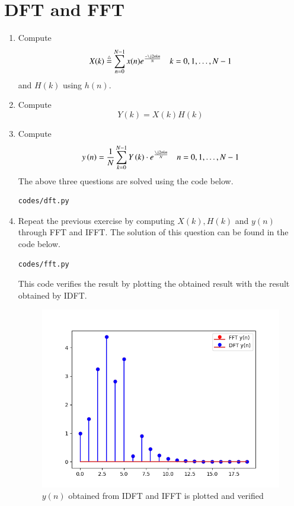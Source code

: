\documentclass[journal,12pt,twocolumn]{IEEEtran}
\newcommand{\define}{\stackrel{\triangle}{=}}
\theoremstyle{remark}
\begin{document}
\section{DFT and FFT}
\begin{enumerate}[label=\thesection.\arabic*]
\item
Compute
\begin{equation}
X(k) \define \sum _{n=0}^{N-1}x(n) e^\frac{-\j2\pi kn}{N} \quad k = 0,1,\dots, N-1
\end{equation}
and $H(k)$ using $h(n)$.
\item Compute 
\begin{equation}
Y(k) = X(k)H(k)
\label{eq:fp}
\end{equation}
\item Compute
\begin{equation}
y\brak{n}={\frac {1}{N}}\sum _{k=0}^{N-1}Y\brak{k}\cdot e^\frac{\j 2\pi kn}{N} \quad n = 0,1,\dots, N-1
\label{eq:inv-ft}
\end{equation}
\solution The above three questions are solved using the code below.
\begin{lstlisting}
codes/dft.py
\end{lstlisting}

\item Repeat the previous exercise by computing $X(k), H(k)$ and $y(n)$ through FFT and IFFT.
\solution The solution of this question can be found in the code below.
\begin{lstlisting}
codes/fft.py
\end{lstlisting}
This code verifies the result by plotting the obtained result with the result obtained by IDFT.

\begin{figure}[ht]
    \centering
    \includegraphics[width=\columnwidth]{figs/ft_comp.png}
    \caption{$y(n)$ obtained from IDFT and IFFT is plotted and verified}
    \label{fig:yn_verf_5.4}
\end{figure}


\end{enumerate}
\end{document}
